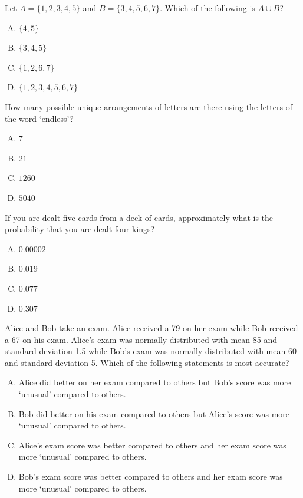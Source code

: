 \documentclass[12pt,letterpaper]{exam}
\begin{document}
\begin{questions}

\question Let $A= \{ 1, 2, 3, 4, 5 \}$ and $B= \{ 3, 4, 5, 6, 7 \}$. Which of the following is $A \cup B$?
	\begin{enumerate}[A.]
	\item $\{ 4, 5 \}$
	\item $\{ 3, 4, 5 \}$
	\item $\{ 1, 2, 6, 7 \}$
	\item $\{ 1, 2, 3, 4, 5, 6, 7 \}$
	\end{enumerate}

\vfill 

\question How many possible unique arrangements of letters are there using the letters of the word `endless'?
	\begin{enumerate}[A.]
	\item $7$
	\item $21$
	\item $1260$
	\item $5040$
	\end{enumerate}

\vfill

\question If you are dealt five cards from a deck of cards, approximately what is the probability that you are dealt four kings?
	\begin{enumerate}[A.]
	\item $0.00002$
	\item $0.019$
	\item $0.077$
	\item $0.307$
	\end{enumerate}

\vfill

\question Alice and Bob take an exam. Alice received a 79 on her exam while Bob received a 67 on his exam. Alice's exam was normally distributed with mean 85 and standard deviation 1.5 while Bob's exam was normally distributed with mean 60 and standard deviation 5. Which of the following statements is most accurate?
	\begin{enumerate}[A.]
	\item Alice did better on her exam compared to others but Bob's score was more `unusual' compared to others. 
	\item Bob did better on his exam compared to others but Alice's score was more `unusual' compared to others. 
	\item Alice's exam score was better compared to others and her exam score was more `unusual' compared to others. 
	\item Bob's exam score was better compared to others and her exam score was more `unusual' compared to others. 
	\end{enumerate}




\end{questions}
\end{document}
